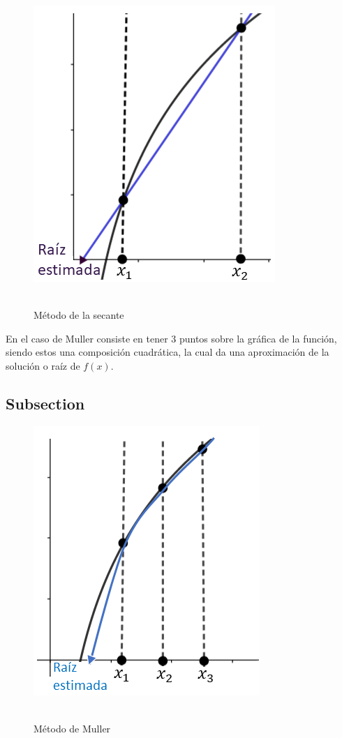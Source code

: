 \documentclass[fleqn,10pt]{SelfArx}
\begin{document}
\begin{figure}[ht]\centering
	\includegraphics[scale=0.5]{GrafSecante.png}
	\\\
	\caption{Método de la secante}
\end{figure}
En el caso de 
Muller consiste en tener 3 puntos sobre la gráfica de la función, 
siendo estos una composición cuadrática, la cual da una aproximación de la solución o raíz de $f(x)$.
\subsection{Subsection}
\begin{figure}[ht]\centering
	\includegraphics[scale=0.5]{GrafMuller.png}
	\\\
	\caption{Método de Muller}
\end{figure}
\end{document}
